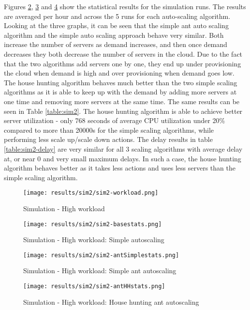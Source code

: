 \documentclass[conference]{IEEEtran}
\begin{document}
Figures \ref{fig:sim2-basestats}, \ref{fig:sim2-antSimplestats} and \ref{fig:sim2-antHHstats} show the statistical results for the simulation runs. The results are averaged per hour and across the 5 runs for each auto-scaling algorithm. Looking at the three graphs, it can be seen that the simple ant auto scaling algorithm and the simple auto scaling approach behave very similar. Both increase the number of servers as demand increases, and then once demand decreases they both decrease the number of servers in the cloud. Due to the fact that the two algorithms add servers one by one, they end up under provisioning the cloud when demand is high and over provisioning when demand goes low. The house hunting algorithm behaves much better than the two simple scaling algorithms as it is able to keep up with the demand by adding more servers at one time and removing more servers at the same time. The same results can be seen in Table \ref{table:sim2}. The house hunting algorithm is able to achieve better server utilization - only 768 seconds of average CPU utilization under 20\% compared to more than 20000s for the simple scaling algorithms, while performing less scale up/scale down actions. The delay results in table \ref{table:sim2-delay} are very similar for all 3 scaling algorithms with average delay at, or near 0 and very small maximum delays. In such a case, the house hunting algorithm behaves better as it takes less actions and uses less servers than the simple scaling algorithm.

\begin{figure}
	\centering
		\texttt{[image: results/sim2/sim2-workload.png]}
	\caption{Simulation - High workload}
	\label{fig:sim2-workload}
\end{figure}

\begin{figure}
	\centering
		\texttt{[image: results/sim2/sim2-basestats.png]}
	\caption{Simulation - High workload: Simple autoscaling}
	\label{fig:sim2-basestats}
\end{figure}

\begin{figure}
	\centering
		\texttt{[image: results/sim2/sim2-antSimplestats.png]}
	\caption{Simulation - High workload: Simple ant autoscaling}
	\label{fig:sim2-antSimplestats}
\end{figure}

\begin{figure}
	\centering
		\texttt{[image: results/sim2/sim2-antHHstats.png]}
	\caption{Simulation - High workload: House hunting ant autoscaling}
	\label{fig:sim2-antHHstats}
\end{figure}
\end{document}
